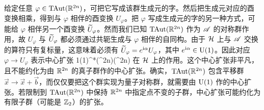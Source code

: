 给定任意 $\varphi\in{\mathrm{TAut}}({\mathbb R}^{2n})$，可把它写成该群生成元的字。然后把生成元对应的酉变换相乘，得到与 $\varphi$ 相伴的酉变换 $U_\varphi$。把 $\varphi$ 写成生成元的字的另一种方式，可能给 $\varphi$ 相伴另一个酉变换 $\widetilde U_\varphi$。然而我们已知 ${\mathrm{TAut}}({\mathbb R}^{2n})$ 作为 ${\mathscr A}$ 的对称群作用，故 $U_\varphi$ 与 $\widetilde U_\varphi$ 都必须通过共轭生成与 $\varphi$ 相伴的自同构。由于 ${\mathcal H}$ 上与 ${\mathscr A}$ 交换的算符只有复标量，这意味着必须有 $\widetilde U_\varphi=e^{{\mathrm i}\alpha}U_\varphi$，其中 $e^{{\mathrm i}\alpha}\in{\mathrm U}(1)$。因此对应 $\varphi\to U_\varphi$ 表示中心扩张
\be\label{centex}1\to\UU(1)\to\TAut^*(\R^{2n})\to\TAut(\R^{2n})\ee
在 ${\mathcal H}$ 上的作用。这个中心扩张非平凡，且不能约化为由 ${\mathbb R}^{2n}$ 的真子群作的中心扩张。确实，${\mathrm{TAut}}({\mathbb R}^{2n})$ 包含平移群 $\vec x\to\vec x+\vec b$，而仅仅要把这个群实现为量子对称群，就需要由 ${\mathrm U}(1)$ 作的中心扩张。若限制到 ${\mathrm{TAut}}({\mathbb R}^{2n})$ 中保持 ${\mathbb R}^{2n}$ 中指定点不变的子群，中心扩张可能约化为有限子群（可能是 ${\mathbb Z}_2$）的扩张。
